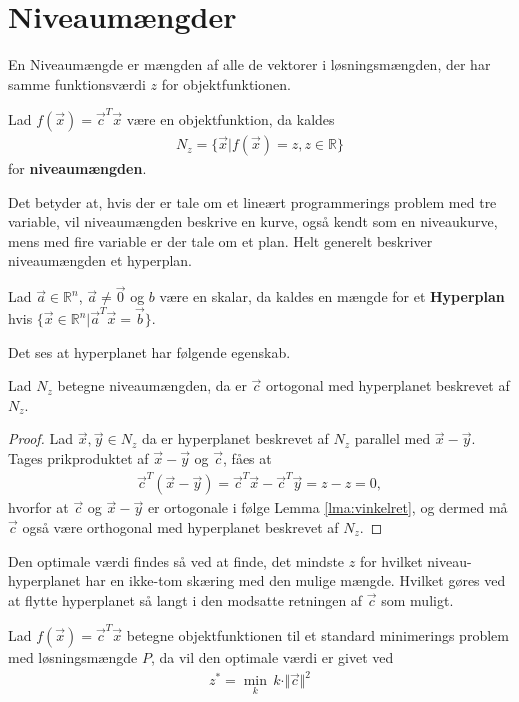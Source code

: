 \section{Niveaumængder}
En Niveaumængde er mængden af alle de vektorer i løsningsmængden, der har samme funktionsværdi $z$ for objektfunktionen.
\begin{defn}[Niveaumængden]
Lad $f(\vec{x})= \vec{c}^T\vec{x}$ være en objektfunktion, da kaldes
\begin{align*}
N_z = \{\vec{x}| f(\vec{x}) = z, z \in \mathds{R}\}
\end{align*}
for \textbf{niveaumængden}.
\end{defn}
Det betyder at, hvis der er tale om et lineært programmerings problem med tre variable, vil niveaumængden beskrive en kurve, også kendt som en niveaukurve, mens med fire variable er der tale om et plan. 
Helt generelt beskriver niveaumængden et hyperplan.
\begin{defn}[Hyperplan]
Lad $ \vec{a} \in \mathds{R}^n$, $\vec{a}\neq \vec{0}$ og $b$ være en skalar, da kaldes en mængde for et \textbf{Hyperplan} hvis $\{ \vec{x} \in \mathds{R}^n | \vec{a}^{T}\vec{x} = \vec{b}\}$.
\end{defn}
Det ses at hyperplanet har følgende egenskab.
\begin{stn}
Lad $N_z$ betegne niveaumængden, da er $\vec{c}$ ortogonal med hyperplanet beskrevet af $N_z$.
\end{stn}
\begin{proof}
Lad $\vec{x}, \vec{y} \in N_z$ da er hyperplanet beskrevet af $N_z$ parallel med $\vec{x}-\vec{y}$.
Tages prikproduktet af $\vec{x}-\vec{y}$ og $\vec{c}$, fåes at
\begin{align*}
\vec{c}^T(\vec{x}-\vec{y}) = \vec{c}^T\vec{x} -\vec{c}^T\vec{y} = z - z = 0,
\end{align*}
hvorfor at $\vec{c}$ og $\vec{x}-\vec{y}$ er ortogonale i følge Lemma \ref{lma:vinkelret}, og dermed må $\vec{c}$ også være orthogonal med hyperplanet beskrevet af $N_z$.
\end{proof}
Den optimale værdi findes så ved at finde, det mindste $z$ for hvilket niveau-hyperplanet har en ikke-tom skæring med den mulige mængde. 
Hvilket gøres ved at flytte hyperplanet så langt i den modsatte retningen af $\vec{c}$ som muligt.
\begin{stn}
Lad $f(\vec{x})=\vec{c}^T\vec{x}$ betegne objektfunktionen til et standard minimerings problem med løsningsmængde $P$, da vil den 
optimale værdi er givet ved
\begin{align*}
z^* = \underset{k}{\min} \, k \cdot \Vert \vec{c} \Vert ^2
\end{align*}
\label{stn:niveau}
\end{stn}
